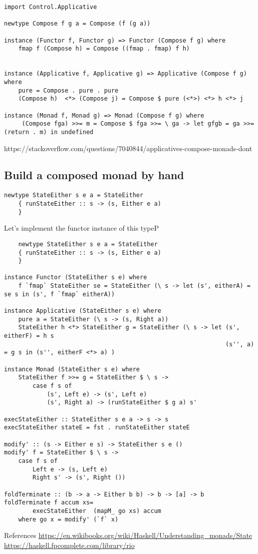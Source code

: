 \begin{verbatim}
import Control.Applicative

newtype Compose f g a = Compose (f (g a))

instance (Functor f, Functor g) => Functor (Compose f g) where
    fmap f (Compose h) = Compose ((fmap . fmap) f h)


instance (Applicative f, Applicative g) => Applicative (Compose f g) where
    pure = Compose . pure . pure
    (Compose h)  <*> (Compose j) = Compose $ pure (<*>) <*> h <*> j

instance (Monad f, Monad g) => Monad (Compose f g) where
     (Compose fga) >>= m = Compose $ fga >>= \ ga -> let gfgb = ga >>= (return . m) in undefined
\end{verbatim}

https://stackoverflow.com/questions/7040844/applicatives-compose-monads-dont


\subsection{Build a composed monad by hand}


\begin{verbatim}
newtype StateEither s e a = StateEither
    { runStateEither :: s -> (s, Either e a)
    }
\end{verbatim}

Let's implement the functor instance of this typeP

\begin{verbatim}
    newtype StateEither s e a = StateEither
    { runStateEither :: s -> (s, Either e a)
    }

instance Functor (StateEither s e) where
    f `fmap` StateEither se = StateEither (\ s -> let (s', eitherA) = se s in (s', f `fmap` eitherA))

instance Applicative (StateEither s e) where
    pure a = StateEither (\ s -> (s, Right a))
    StateEither h <*> StateEither g = StateEither (\ s -> let (s', eitherF) = h s
                                                              (s'', a)      = g s in (s'', eitherF <*> a) )

instance Monad (StateEither s e) where
    StateEither f >>= g = StateEither $ \ s ->
        case f s of
            (s', Left e) -> (s', Left e)
            (s', Right a) -> (runStateEither $ g a) s'

execStateEither :: StateEither s e a -> s -> s
execStateEither stateE = fst . runStateEither stateE

modify' :: (s -> Either e s) -> StateEither s e ()
modify' f = StateEither $ \ s ->
    case f s of
        Left e -> (s, Left e)
        Right s' -> (s', Right ())

foldTerminate :: (b -> a -> Either b b) -> b -> [a] -> b
foldTerminate f accum xs=
        execStateEither  (mapM_ go xs) accum
    where go x = modify' (`f` x)
\end{verbatim}

 References
 \url{https://en.wikibooks.org/wiki/Haskell/Understanding_monads/State}
 \url{https://haskell.fpcomplete.com/library/rio}
